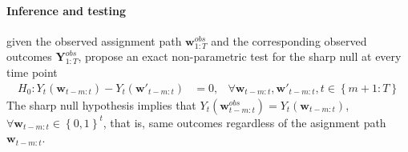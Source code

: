 \documentclass[twoside]{article}
\begin{document}
\paragraph*{Inference and testing} given the observed assignment path $\mathbf{w}^{obs}_{1:T}$ and the corresponding observed outcomes $\mathbf{Y}^{obs}_{1:T}$, \citet{bojinov2023design} propose an exact non-parametric test for the sharp null at every time point 
\begin{align*}
    H_0:Y_t(\mathbf{w}_{t-m:t})-Y_t(\mathbf{w}'_{t-m:t}) &=0, & \forall \mathbf{w}_{t-m:t},\mathbf{w}'_{t-m:t},t\in\left\{m+1:T\right\}
\end{align*}
The sharp null hypothesis implies that $Y_t(\mathbf{w}^{obs}_{t-m:t}) = Y_t(\mathbf{w}_{t-m:t})$, $\forall \mathbf{w}_{t-m:t}\in\left\{0,1\right\}^t$, that is, same outcomes regardless of the asignment path $\mathbf{w}_{t-m:t}$.
\end{document}
